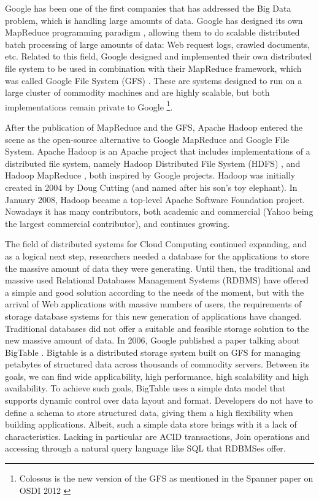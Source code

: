 Google has been one of the first companies that has addressed the Big Data problem, which is handling large amounts of data. Google has designed its own MapReduce programming paradigm \cite{dean2008mapreduce}, allowing them to do scalable distributed batch processing of large amounts of data: Web request logs, crawled documents, etc. Related to this field, Google designed and implemented their own distributed file system to be used in combination with their MapReduce framework, which was called Google File System (GFS) \cite{ghemawat2003google}. These are systems designed to run on a large cluster of commodity machines and are highly scalable, but both implementations remain private to Google \footnote{Colossus is the new version of the GFS as mentioned in the Spanner paper on OSDI 2012 \cite{corbett2012spanner}}.
\par
After the publication of MapReduce and the GFS, Apache Hadoop \cite{ApacheHadoop} entered the scene as the open-source alternative to Google MapReduce and Google File System. Apache Hadoop is an Apache project that includes implementations of a distributed file system, namely Hadoop Distributed File System (HDFS)  \cite{white2012hadoop, shvachko2010hadoop}, and Hadoop MapReduce \cite{ApacheHadoop}, both inspired by Google projects. Hadoop was initially created in 2004 by Doug Cutting (and named after his son's toy elephant). In January 2008, Hadoop became a top-level Apache Software Foundation project. Nowadays it has many contributors, both academic and commercial (Yahoo being the largest commercial contributor), and continues growing.
\par
The field of distributed systems for Cloud Computing continued expanding, and as a logical next step, researchers needed a database for the applications to store the massive amount of data they were generating. Until then, the traditional and massive used Relational Databases Management Systems (RDBMS) have offered a simple and good solution according to the needs of the moment, but with the arrival of Web applications with massive numbers of users, the requirements of storage database systems for this new generation of applications have changed. Traditional databases did not offer a suitable and feasible storage solution to the new massive amount of data. In 2006, Google published a paper talking about BigTable \cite{chang2008bigtable}. Bigtable is a distributed storage system built on GFS for managing petabytes of structured data across thousands of commodity servers. Between its goals, we can find wide applicability, high performance, high scalability and high availability. To achieve such goals, BigTable uses a simple data model that supports dynamic control over data layout and format. Developers do not have to define a schema to store structured data, giving them a high flexibility when building applications. Albeit, such a simple data store brings with it a lack of characteristics. Lacking in particular are ACID transactions, Join operations and accessing through a natural query language like SQL that RDBMSes offer.

